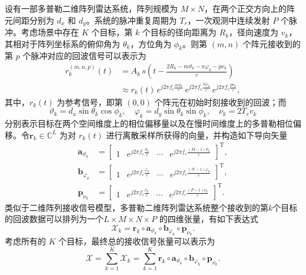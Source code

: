 设有一部多普勒二维阵列雷达系统，阵列规模为 \(M \times N\)，在两个正交方向上的阵元间距分别为 \(d_x\) 和 \(d_y\)。系统的脉冲重复周期为 \(T_r\)，一次观测中连续发射 \(P\) 个脉冲。考虑场景中存在 \(K\) 个目标，第 \(k\) 个目标的径向距离为 \(R_k\)，径向速度为 \(v_k\)，其相对于阵列坐标系的俯仰角为 \(\theta_k\)，方位角为 \(\phi_k\)。则第 \((m,n)\) 个阵元接收到的第 \(p\) 个脉冲对应的回波信号可以表示为
\[
    \begin{split}
        r^{(m,n,p)}_k(t)
         & = A_k\, s\left(t - \frac{2 R_k - m\vartheta_k - n\varphi_k - p\nu_k}{c}\right) \\
         & \approx r_k(t)\,
        e^{j 2 \pi f_c \tfrac{m \vartheta_k}{c}}\,
        e^{j 2 \pi f_c \tfrac{n \varphi_k}{c}}\,
        e^{j 2 \pi f_c \tfrac{p \nu_k}{c}},
    \end{split}
\]
其中，\(r_k(t)\) 为参考信号，即第 \((0,0)\) 个阵元在初始时刻接收到的回波；而
\[
    \vartheta_k = d_x \sin\theta_k \cos\phi_k,
    \quad
    \varphi_k = d_y \sin\theta_k \sin\phi_k,
    \quad
    \nu_k = 2 T_r v_k
\]
分别表示目标在两个空间维度上的相位偏移量以及在慢时间维度上的多普勒相位偏移。令\( \bm{r}_k \in \mathbb{C}^{L} \) 为对 \(r_k(t)\) 进行离散采样所获得的向量，并构造如下导向矢量
\[
    \begin{split}
        \bm{a}_{\vartheta_k} & = \begin{bmatrix}
                                     1 & e^{j 2 \pi f_c \frac{\vartheta_k}{c}} & \cdots & e^{j 2 \pi f_c \frac{(M-1) \vartheta_k}{c}}
                                 \end{bmatrix}^{\mathrm{T}}, \\
        \bm{b}_{\varphi_k}   & = \begin{bmatrix}
                                     1 & e^{j 2 \pi f_c \frac{\varphi_k}{c}} & \cdots & e^{j 2 \pi f_c \frac{(N-1) \varphi_k}{c}}
                                 \end{bmatrix}^{\mathrm{T}}, \\
        \bm{p}_{\nu_k}       & = \begin{bmatrix}
                                     1 & e^{j 2 \pi f_c \frac{\nu_k}{c}} & \cdots & e^{j 2 \pi f_c \frac{(P-1) \nu_k}{c}}
                                 \end{bmatrix}^{\mathrm{T}}.
    \end{split}
\]
类似于二维阵列接收信号模型，多普勒二维阵列雷达系统整个接收到的第\( k \)个目标的回波数据可以排列为一个\( L \times M \times N \times P \) 的四维张量，有如下表达式
\[
    \mathcal{X}_k = \bm{r}_k \circ \bm{a}_{\vartheta_k} \circ \bm{b}_{\varphi_k} \circ \bm{p}_{\nu_k}.
\]
考虑所有的 \(K\) 个目标，最终总的接收信号张量可以表示为
\[
    \mathcal{X} = \sum_{k=1}^{K} \mathcal{X}_k = \sum_{k=1}^{K} \bm{r}_k \circ \bm{a}_{\vartheta_k} \circ \bm{b}_{\varphi_k} \circ \bm{p}_{\nu_k}.
\]

